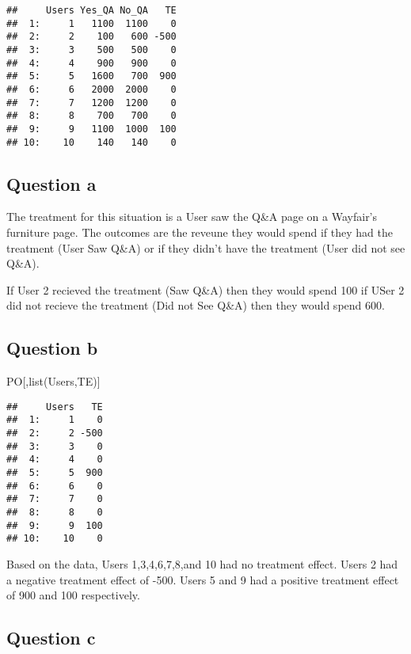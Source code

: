 \documentclass[
]{article}
\newenvironment{Shaded}{\begin{snugshade}}{\end{snugshade}}
\newcommand{\FunctionTok}[1]{\textcolor[rgb]{0.00,0.00,0.00}{#1}}
\newcommand{\NormalTok}[1]{#1}
\begin{document}
\begin{verbatim}
##     Users Yes_QA No_QA   TE
##  1:     1   1100  1100    0
##  2:     2    100   600 -500
##  3:     3    500   500    0
##  4:     4    900   900    0
##  5:     5   1600   700  900
##  6:     6   2000  2000    0
##  7:     7   1200  1200    0
##  8:     8    700   700    0
##  9:     9   1100  1000  100
## 10:    10    140   140    0
\end{verbatim}

\hypertarget{question-a}{%
\subsection{Question a}\label{question-a}}

The treatment for this situation is a User saw the Q\&A page on a
Wayfair's furniture page. The outcomes are the reveune they would spend
if they had the treatment (User Saw Q\&A) or if they didn't have the
treatment (User did not see Q\&A).

If User 2 recieved the treatment (Saw Q\&A) then they would spend 100 if
USer 2 did not recieve the treatment (Did not See Q\&A) then they would
spend 600.

\hypertarget{question-b}{%
\subsection{Question b}\label{question-b}}

\begin{Shaded}
\begin{Highlighting}[]
\NormalTok{PO[,}\FunctionTok{list}\NormalTok{(Users,TE)]}
\end{Highlighting}
\end{Shaded}

\begin{verbatim}
##     Users   TE
##  1:     1    0
##  2:     2 -500
##  3:     3    0
##  4:     4    0
##  5:     5  900
##  6:     6    0
##  7:     7    0
##  8:     8    0
##  9:     9  100
## 10:    10    0
\end{verbatim}

Based on the data, Users 1,3,4,6,7,8,and 10 had no treatment effect.
Users 2 had a negative treatment effect of -500. Users 5 and 9 had a
positive treatment effect of 900 and 100 respectively.

\hypertarget{question-c}{%
\subsection{Question c}\label{question-c}}
\end{document}
